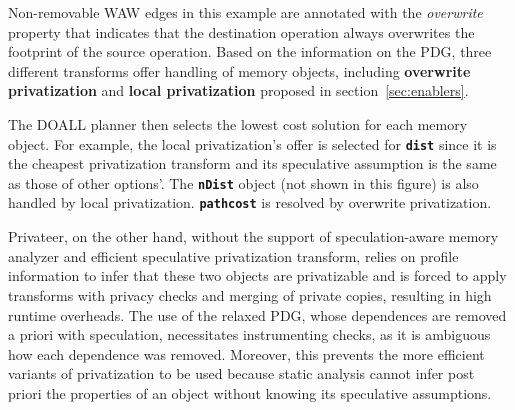 Non-removable WAW edges in this example are annotated with
the \textit{overwrite} property that indicates that the destination
operation always overwrites the footprint of the source operation.
%
Based on the information on the PDG, three different transforms offer
handling of memory objects, including \textbf{overwrite privatization} and
\textbf{local privatization} proposed in
section~\ref{sec:enablers}.

%
%
The DOALL planner then selects the lowest cost solution for each memory
object. For example, the local privatization's
offer is selected for \texttt{\textbf{dist}} since it is the cheapest
privatization transform and its
speculative assumption is the same as those of other options'.
The \texttt{\textbf{nDist}} object (not shown in this figure) is also handled
by local privatization. \texttt{\textbf{pathcost}} is resolved by overwrite
privatization.



%
Privateer, on the other hand, without the support of speculation-aware
memory analyzer and  efficient speculative privatization transform, relies
on profile information to infer that these two objects are privatizable and
is forced to apply transforms with privacy checks and merging of private
copies, resulting in high runtime overheads. The use of the relaxed PDG,
whose dependences are removed a priori with speculation, necessitates
instrumenting checks, as it is ambiguous how each dependence was removed.
Moreover, this prevents the more efficient variants of privatization to be
used because static analysis cannot infer post priori the properties of an
object without knowing its speculative assumptions.

%




